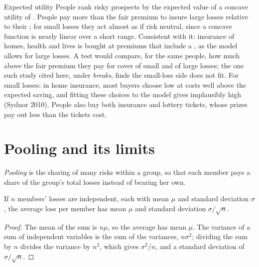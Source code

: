 \begin{model}{Expected utility}
\assumes People rank risky prospects by the expected value of a concave utility of .
\predicts People pay more than the fair premium to insure large losses relative to their ; for small losses they act almost as if risk neutral, since a concave
  function is nearly linear over a short range.
\tested Consistent with it: insurance of homes, health and lives is bought at premiums that include a , as the model allows for large losses.
  A test would compare, for the same people, how much above the fair premium they pay for cover of small and of large losses; the one such study
  cited here, under \emph{breaks}, finds the small-loss side does not fit.
\breaks For small losses: in home insurance, most buyers choose low  at costs well above the expected saving, and fitting these choices to the model gives
  implausibly high  (Sydnor 2010). People also buy both insurance and lottery tickets, whose prizes pay out less than the tickets cost.
\end{model}

\section{Pooling and its limits}\label{sec:g12:risk-and-insurance:pooling}

\begin{definition}[Pooling]\label{def:g12:risk-and-insurance:pooling}
\emph{Pooling} is the sharing of many risks within a group, so that each member pays a share of the group's total losses instead of bearing her own.
\end{definition}

\begin{proposition}\label{prop:g12:risk-and-insurance:pool}
If $n$ members' losses are independent, each with mean $\mu$ and standard deviation $\sigma$, the average loss per member has mean $\mu$ and standard deviation
$\sigma/\sqrt{n}$.
\end{proposition}
\begin{proof}
The mean of the sum is $n\mu$, so the average has mean $\mu$. The variance of a sum of independent variables is the sum of the variances, $n\sigma^2$; dividing the sum by
$n$ divides the variance by $n^2$, which gives $\sigma^2/n$, and a standard deviation of $\sigma/\sqrt{n}$.
\end{proof}

